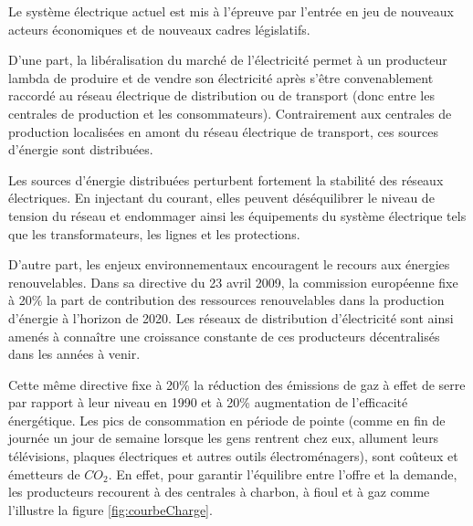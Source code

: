 Le système électrique actuel est mis à l'épreuve par l'entrée en jeu de nouveaux 
acteurs économiques et de nouveaux cadres législatifs. 

D'une part, la libéralisation du marché de l'électricité permet à un producteur 
lambda de produire et de vendre son électricité après s'être convenablement 
raccordé au réseau électrique de distribution ou de transport (donc entre les 
centrales de production et les consommateurs). Contrairement aux centrales de 
production localisées en amont du réseau électrique de transport, ces sources 
d'énergie sont distribuées. 

Les sources d'énergie distribuées perturbent fortement la stabilité des réseaux 
électriques. En injectant du courant, elles peuvent déséquilibrer le niveau de 
tension du réseau et endommager ainsi les équipements du système électrique tels 
que les transformateurs, les lignes et les protections. 

D'autre part, les enjeux environnementaux encouragent le recours aux énergies 
renouvelables. Dans sa directive du 23 avril 2009, la commission européenne fixe 
à 20\% la part de contribution des ressources renouvelables dans la production 
d'énergie à l'horizon de 2020. Les réseaux de distribution d'électricité sont 
ainsi amenés à connaître une croissance constante de ces producteurs 
décentralisés dans les années à venir.

Cette même directive fixe à 20\% la réduction des émissions de gaz à effet de 
serre par rapport à leur niveau en 1990 et à 20\% augmentation de l'efficacité 
énergétique. Les pics de consommation en période de pointe (comme en fin de 
journée un jour de semaine lorsque les gens rentrent chez eux, allument leurs 
télévisions, plaques électriques et autres outils électroménagers), sont coûteux 
et émetteurs de $CO_{2}$. En effet, pour garantir l'équilibre entre l'offre et 
la demande, les producteurs recourent à des centrales à charbon, à fioul et à 
gaz comme l'illustre la figure \ref{fig:courbeCharge}.

